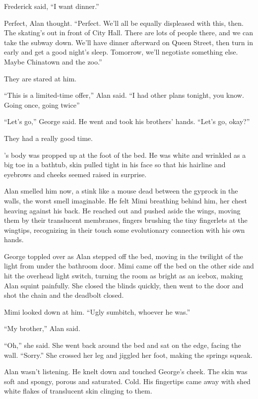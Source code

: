 Frederick said, ``I want dinner.''

Perfect, Alan thought.  ``Perfect.  We'll all be equally displeased
with this, then.  The skating's out in front of City Hall.  There are
lots of people there, and we can take the subway down.  We'll have
dinner afterward on Queen Street, then turn in early and get a good
night's sleep.  Tomorrow, we'll negotiate something else.  Maybe
Chinatown and the zoo.''

They are stared at him.

``This is a limited-time offer,'' Alan said.  ``I had other plans
tonight, you know.  Going once, going twice\dash{}''

``Let's go,'' George said.  He went and took his brothers' hands. 
``Let's go, okay?''

They had a really good time.

's body was propped up at the foot of the bed.  He was white and
wrinkled as a big toe in a bathtub, skin pulled tight in his face so
that his hairline and eyebrows and cheeks seemed raised in surprise.

Alan smelled him now, a stink like a mouse dead between the gyprock in
the walls, the worst smell imaginable.  He felt Mimi breathing behind
him, her chest heaving against his back.  He reached out and pushed
aside the wings, moving them by their translucent membranes, fingers
brushing the tiny fingerlets at the wingtips, recognizing in their
touch some evolutionary connection with his own hands.

George toppled over as Alan stepped off the bed, moving in the
twilight of the light from under the bathroom door.  Mimi came off the
bed on the other side and hit the overhead light switch, turning the
room as bright as an icebox, making Alan squint painfully.  She closed
the blinds quickly, then went to the door and shot the chain and the
deadbolt closed.

Mimi looked down at him.  ``Ugly sumbitch, whoever he was.''

``My brother,'' Alan said.

``Oh,'' she said.  She went back around the bed and sat on the edge,
facing the wall.  ``Sorry.'' She crossed her leg and jiggled her foot,
making the springs squeak.

Alan wasn't listening.  He knelt down and touched George's cheek.  The
skin was soft and spongy, porous and saturated.  Cold.  His fingertips
came away with shed white flakes of translucent skin clinging to them.

